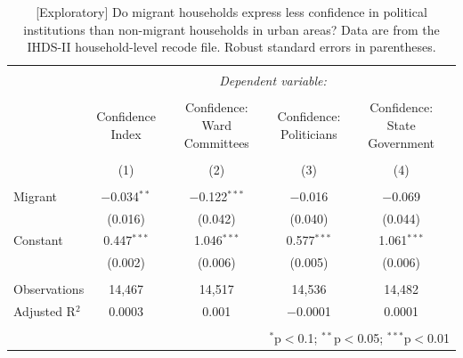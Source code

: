 \documentclass[
  11.5pt,
]{article}
\begin{document}
\begin{table}[!htbp] \centering 
  \caption{[Exploratory] Do migrant households express less confidence in political institutions than non-migrant households in urban areas? Data are from the IHDS-II household-level recode file. Robust standard errors in parentheses.} 
  \label{tab:ihds2_confidence_urban} 
\small 
\begin{tabular}{@{\extracolsep{5pt}}lcccc} 
\\[-1.8ex]\hline 
\hline \\[-1.8ex] 
 & \multicolumn{4}{c}{\textit{Dependent variable:}} \\ 
\cline{2-5} 
\\[-1.8ex] & \shortstack{Confidence \\ Index} & \shortstack{Confidence: \\ Ward Committees} & \shortstack{Confidence: \\ Politicians} & \shortstack{Confidence: \\ State Government} \\ 
\\[-1.8ex] & (1) & (2) & (3) & (4)\\ 
\hline \\[-1.8ex] 
 Migrant & $-$0.034$^{**}$ & $-$0.122$^{***}$ & $-$0.016 & $-$0.069 \\ 
  & (0.016) & (0.042) & (0.040) & (0.044) \\ 
  Constant & 0.447$^{***}$ & 1.046$^{***}$ & 0.577$^{***}$ & 1.061$^{***}$ \\ 
  & (0.002) & (0.006) & (0.005) & (0.006) \\ 
 \hline \\[-1.8ex] 
Observations & 14,467 & 14,517 & 14,536 & 14,482 \\ 
Adjusted R$^{2}$ & 0.0003 & 0.001 & $-$0.0001 & 0.0001 \\ 
\hline 
\hline \\[-1.8ex] 
\multicolumn{5}{r}{$^{*}$p$<$0.1; $^{**}$p$<$0.05; $^{***}$p$<$0.01} \\ 
\end{tabular} 
\end{table}
\end{document}
